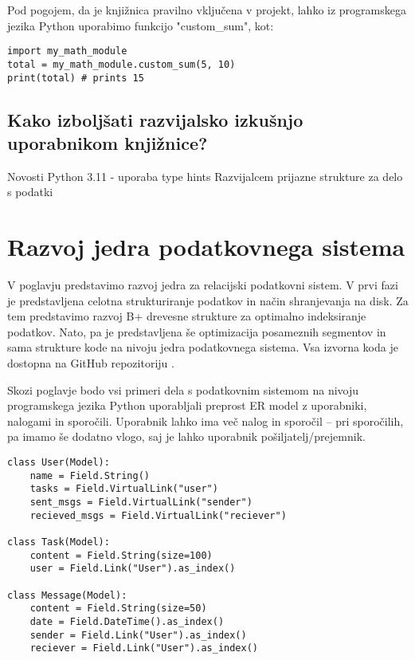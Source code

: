 \documentclass[a4paper,12pt,openright]{book}
\begin{document}
    \noindent
    Pod pogojem, da je knjižnica pravilno vključena v projekt, lahko iz programskega jezika Python uporabimo funkcijo "custom\_sum", kot:
\begin{verbatim}
import my_math_module
total = my_math_module.custom_sum(5, 10)
print(total) # prints 15
\end{verbatim}

    \section{Kako izboljšati razvijalsko izkušnjo uporabnikom knjižnice?}

    \colorbox{BurntOrange}{Novosti Python 3.11 - uporaba type hints}\newline 
    \colorbox{BurntOrange}{Razvijalcem prijazne strukture za delo s podatki}

\chapter{Razvoj jedra podatkovnega sistema}
\label{ch0}
    V poglavju predstavimo razvoj jedra za relacijski podatkovni sistem. V prvi fazi je predstavljena celotna strukturiranje podatkov in način shranjevanja na disk. Za tem predstavimo razvoj B+ drevesne strukture za optimalno indeksiranje podatkov. Nato, pa je predstavljena še optimizacija posameznih segmentov in sama strukture kode na nivoju jedra podatkovnega sistema. Vsa izvorna koda je dostopna na GitHub repozitoriju \cite{GRAPHENIX_GITHUB}.

    \newpage
    \noindent
    Skozi poglavje bodo vsi primeri dela s podatkovnim sistemom na nivoju programskega jezika Python uporabljali preprost ER model z uporabniki, nalogami in sporočili. Uporabnik lahko ima več nalog in sporočil – pri sporočilih, pa imamo še dodatno vlogo, saj je lahko uporabnik pošiljatelj/prejemnik.
\begin{verbatim}
class User(Model):
    name = Field.String()
    tasks = Field.VirtualLink("user")
    sent_msgs = Field.VirtualLink("sender")
    recieved_msgs = Field.VirtualLink("reciever")

class Task(Model):
    content = Field.String(size=100)
    user = Field.Link("User").as_index()

class Message(Model):
    content = Field.String(size=50)
    date = Field.DateTime().as_index()
    sender = Field.Link("User").as_index()
    reciever = Field.Link("User").as_index()
\end{verbatim}
    
\end{document}
